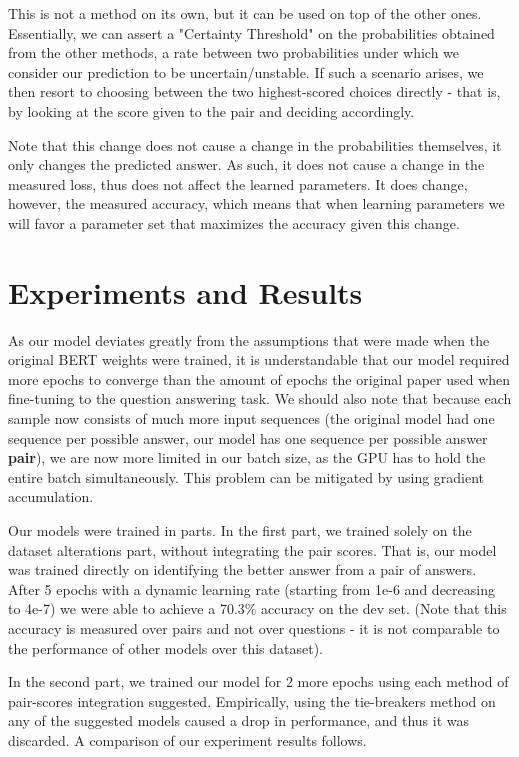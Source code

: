 \documentclass{article}
\begin{document}
This is not a method on its own, but it can be used on top of the other ones.
Essentially, we can assert a "Certainty Threshold" on the probabilities obtained from the other methods, a rate between two probabilities under which we consider our prediction to be uncertain/unstable.
If such a scenario arises, we then resort to choosing between the two highest-scored choices directly - that is, by looking at the score given to the pair and deciding accordingly.

Note that this change does not cause a change in the probabilities themselves, it only changes the predicted answer. As such, it does not cause a change in the measured loss, thus does not affect the learned parameters. It does change, however, the measured accuracy, which means that when learning parameters we will favor a parameter set that maximizes the accuracy given this change.

\section{Experiments and Results} 

As our model deviates greatly from the assumptions that were made when the original BERT weights were trained, it is understandable that our model required more epochs to converge than the amount of epochs the original paper used when fine-tuning to the question answering task.
We should also note that because each sample now consists of much more input sequences (the original model had one sequence per possible answer, our model has one sequence per possible answer \textbf{pair}), we are now more limited in our batch size, as the GPU has to hold the entire batch simultaneously. This problem can be mitigated by using gradient accumulation.

Our models were trained in parts.
In the first part, we trained solely on the dataset alterations part, without integrating the pair scores. That is, our model was trained directly on identifying the better answer from a pair of answers. After 5 epochs with a dynamic learning rate (starting from 1e-6 and decreasing to 4e-7) we were able to achieve a 70.3\% accuracy on the dev set. (Note that this accuracy is measured over pairs and not over questions - it is not comparable to the performance of other models over this dataset).

In the second part, we trained our model for 2 more epochs using each method of pair-scores integration suggested. Empirically, using the tie-breakers method on any of the suggested models caused a drop in performance, and thus it was discarded.
A comparison of our experiment results follows.
\end{document}
